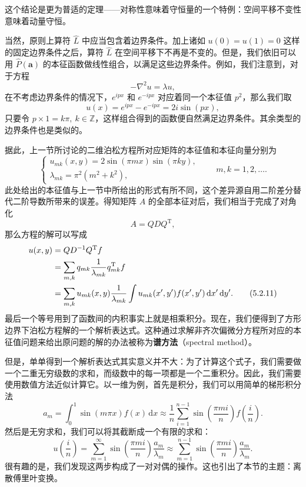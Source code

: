 这个结论是更为普适的定理——对称性意味着守恒量的一个特例：空间平移不变性意味着动量守恒。

当然，原则上算符 $\hat L$ 中应当包含着边界条件。加上诸如 $u(0)=u(1)=0$ 这样的固定边界条件之后，算符 $\hat L$ 在空间平移下不再是不变的。但是，我们依旧可以用 $\hat P(\bm a)$ 的本征函数做线性组合，以满足这些边界条件。例如，我们注意到，对于方程
\begin{equation}
-\nabla^2u=\lambda u,
\tag{5.2.7}
\end{equation}
在不考虑边界条件的情况下，$e^{ipx}$ 和 $e^{-ipx}$ 对应着同一个本征值 $p^2$，那么我们取
\begin{equation}
u(x)=e^{ipx}-e^{-ipx}=2i\sin(px),
\tag{5.2.8}
\end{equation}
只要令 $p\times1=k\pi,\ k\in\mathbb Z$，这样组合得到的函数便自然满足边界条件。其余类型的边界条件也是类似的。

据此，上一节所讨论的二维泊松方程所对应矩阵的本征值和本征向量分别为
\begin{equation}
\begin{cases}
 u_{mk}(x,y)=2\sin(\pi mx)\sin(\pi ky),\\
 \lambda_{mk}=\pi^2(m^2+k^2),
\end{cases}
\qquad m,k=1,2,\ldots.
\tag{5.2.9}
\end{equation}
此处给出的本征值与上一节中所给出的形式有所不同，这个差异源自用二阶差分替代二阶导数所带来的误差。得知矩阵 $A$ 的全部本征对后，我们相当于完成了对角化
\begin{equation}
A=QDQ^{\mathrm T},
\tag{5.2.10}
\end{equation}
那么方程的解可以写成
\begin{align}
u(x,y)&=QD^{-1}Q^{\mathrm T}f\notag\\
&=\sum_{m,k}q_{mk}\frac1{\lambda_{mk}}q_{mk}^{\mathrm T}f\notag\\
&=\sum_{m,k}u_{mk}(x,y)\frac1{\lambda_{mk}}
\int u_{mk}(x',y')f(x',y')\,\mathrm dx'\,\mathrm dy'.
\tag{5.2.11}
\end{align}
最后一个等号用到了函数间的内积事实上就是相乘积分。现在，我们便得到了方形边界下泊松方程解的一个解析表达式。这种通过求解非齐次偏微分方程所对应的本征值问题来给出原问题的解的办法被称为\textbf{谱方法}（spectral method）。

但是，单单得到一个解析表达式其实意义并不大：为了计算这个式子，我们需要做一个二重无穷级数的求和，而级数中的每一项都是一个二重积分。因此，我们需要使用数值方法近似计算它。以一维为例，首先是积分，我们可以用简单的梯形积分法
\begin{equation}
a_m=\int_0^1\sin(m\pi x)f(x)\,\mathrm dx
\approx\frac1n\sum_{i=1}^{n-1}\sin\!\left(\frac{\pi mi}{n}\right)f\!\left(\frac{i}{n}\right).
\tag{5.2.12}
\end{equation}
然后是无穷求和，我们可以将其截断成一个有限的求和：
\begin{equation}
u\!\left(\frac{i}{n}\right)
=\sum_{m=1}^{\infty}\sin\!\left(\frac{\pi mi}{n}\right)\frac{a_m}{\lambda_m}
\approx\sum_{m=1}^{n-1}\sin\!\left(\frac{\pi mi}{n}\right)\frac{a_m}{\lambda_m}.
\tag{5.2.13}
\end{equation}
很有趣的是，我们发现这两步构成了一对对偶的操作。这也引出了本节的主题：离散傅里叶变换。

